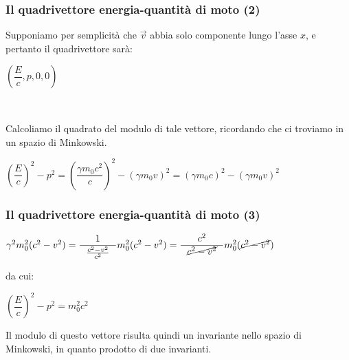 \documentclass[]{beamer}
\theoremstyle{plain}
\begin{document}
\begin{frame}
\frametitle{Il quadrivettore energia-quantità di moto (2)}
Supponiamo per semplicità che $ \vec{v} $ abbia solo componente lungo l'asse $ x $, e pertanto il quadrivettore sarà:
\begin{center}
$ \left( \dfrac{E}{c} , p , 0 , 0 \right) $
\end{center}\pause

~

Calcoliamo il quadrato del modulo di tale vettore, ricordando che ci troviamo in un spazio di Minkowski.
\begin{center}
$ \left( \dfrac{E}{c} \right)^2 - p^2 = \left(\dfrac{\gamma m_0 c^2}{c}\right)^2 - (\gamma m_0 v)^2 = \left(\gamma m_0 c\right)^2 - (\gamma m_0 v)^2 $
\end{center}
\end{frame}

\begin{frame}
\frametitle{Il quadrivettore energia-quantità di moto (3)}
\begin{center}
$ \gamma^2 m_0^2 (c^2 - v^2) = \dfrac{1}{~~\frac{c^2 - v^2}{c^2}~~} m_0^2 (c^2 - v^2) = \dfrac{c^2}{~~\cancel{c^2 - v^2}~~} m_0^2 (\cancel{c^2 - v^2})$
\end{center}\pause
da cui:
\begin{center}
\colorbox{blue!30}{$ \left( \dfrac{E}{c} \right)^2 - p^2 = m_0^2 c^2  $}
\end{center}\pause

\alert{Il modulo di questo vettore risulta quindi un invariante nello spazio di Minkowski}, in quanto prodotto di due invarianti.
\end{frame}
\end{document}
